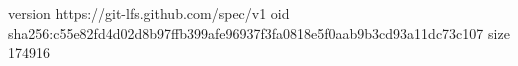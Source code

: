 version https://git-lfs.github.com/spec/v1
oid sha256:c55e82fd4d02d8b97ffb399afe96937f3fa0818e5f0aab9b3cd93a11dc73c107
size 174916
